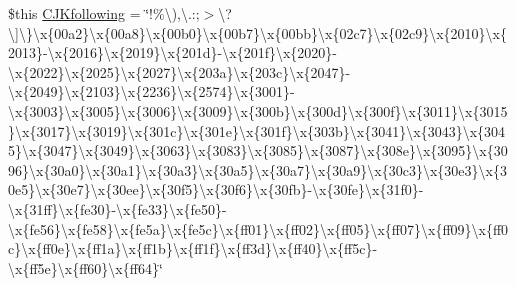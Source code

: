 \begin{DoxyCompactItemize}
\item 
\$this \hyperlink{config_8php_aa6bb975979bbbab2f19827e1f704d4e3}{C\-J\-Kfollowing} = \char`\"{}!\%\textbackslash{}),\textbackslash{}.\-:;$>$\textbackslash{}?\textbackslash{}\mbox{]}\textbackslash{}\}\textbackslash{}x\{00a2\}\textbackslash{}x\{00a8\}\textbackslash{}x\{00b0\}\textbackslash{}x\{00b7\}\textbackslash{}x\{00bb\}\textbackslash{}x\{02c7\}\textbackslash{}x\{02c9\}\textbackslash{}x\{2010\}\textbackslash{}x\{2013\}-\/\textbackslash{}x\{2016\}\textbackslash{}x\{2019\}\textbackslash{}x\{201d\}-\/\textbackslash{}x\{201f\}\textbackslash{}x\{2020\}-\/\textbackslash{}x\{2022\}\textbackslash{}x\{2025\}\textbackslash{}x\{2027\}\textbackslash{}x\{203a\}\textbackslash{}x\{203c\}\textbackslash{}x\{2047\}-\/\textbackslash{}x\{2049\}\textbackslash{}x\{2103\}\textbackslash{}x\{2236\}\textbackslash{}x\{2574\}\textbackslash{}x\{3001\}-\/\textbackslash{}x\{3003\}\textbackslash{}x\{3005\}\textbackslash{}x\{3006\}\textbackslash{}x\{3009\}\textbackslash{}x\{300b\}\textbackslash{}x\{300d\}\textbackslash{}x\{300f\}\textbackslash{}x\{3011\}\textbackslash{}x\{3015\}\textbackslash{}x\{3017\}\textbackslash{}x\{3019\}\textbackslash{}x\{301c\}\textbackslash{}x\{301e\}\textbackslash{}x\{301f\}\textbackslash{}x\{303b\}\textbackslash{}x\{3041\}\textbackslash{}x\{3043\}\textbackslash{}x\{3045\}\textbackslash{}x\{3047\}\textbackslash{}x\{3049\}\textbackslash{}x\{3063\}\textbackslash{}x\{3083\}\textbackslash{}x\{3085\}\textbackslash{}x\{3087\}\textbackslash{}x\{308e\}\textbackslash{}x\{3095\}\textbackslash{}x\{3096\}\textbackslash{}x\{30a0\}\textbackslash{}x\{30a1\}\textbackslash{}x\{30a3\}\textbackslash{}x\{30a5\}\textbackslash{}x\{30a7\}\textbackslash{}x\{30a9\}\textbackslash{}x\{30c3\}\textbackslash{}x\{30e3\}\textbackslash{}x\{30e5\}\textbackslash{}x\{30e7\}\textbackslash{}x\{30ee\}\textbackslash{}x\{30f5\}\textbackslash{}x\{30f6\}\textbackslash{}x\{30fb\}-\/\textbackslash{}x\{30fe\}\textbackslash{}x\{31f0\}-\/\textbackslash{}x\{31ff\}\textbackslash{}x\{fe30\}-\/\textbackslash{}x\{fe33\}\textbackslash{}x\{fe50\}-\/\textbackslash{}x\{fe56\}\textbackslash{}x\{fe58\}\textbackslash{}x\{fe5a\}\textbackslash{}x\{fe5c\}\textbackslash{}x\{ff01\}\textbackslash{}x\{ff02\}\textbackslash{}x\{ff05\}\textbackslash{}x\{ff07\}\textbackslash{}x\{ff09\}\textbackslash{}x\{ff0c\}\textbackslash{}x\{ff0e\}\textbackslash{}x\{ff1a\}\textbackslash{}x\{ff1b\}\textbackslash{}x\{ff1f\}\textbackslash{}x\{ff3d\}\textbackslash{}x\{ff40\}\textbackslash{}x\{ff5c\}-\/\textbackslash{}x\{ff5e\}\textbackslash{}x\{ff60\}\textbackslash{}x\{ff64\}\char`\"{}
\item 

\end{DoxyCompactItemize}
